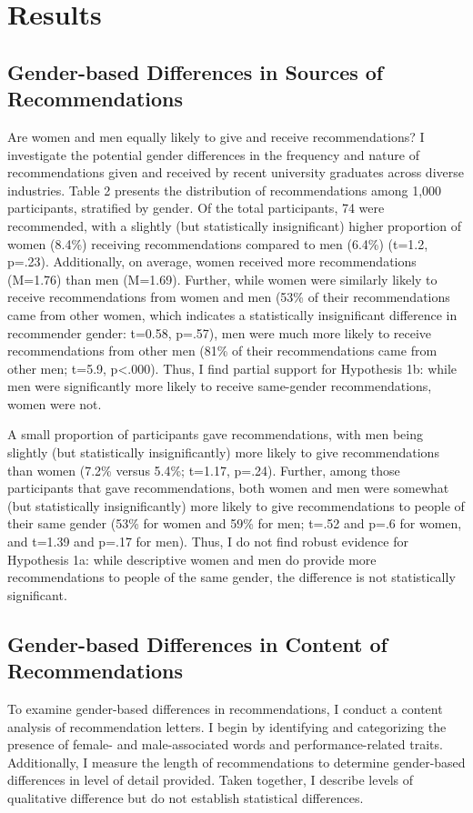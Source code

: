 \documentclass[12pt]{caltech_thesis}
\begin{document}
\chapter{Results}
\section{Gender-based Differences in Sources of Recommendations}
Are women and men equally likely to give and receive recommendations? I investigate the potential gender differences in the frequency and nature of recommendations given and received by recent university graduates across diverse industries. Table 2 presents the distribution of recommendations among 1,000 participants, stratified by gender. Of the total participants, 74 were recommended, with a slightly (but statistically insignificant) higher proportion of women (8.4\%) receiving recommendations compared to men (6.4\%) (t=1.2, p=.23). Additionally, on average, women received more recommendations (M=1.76) than men (M=1.69). Further, while women were similarly likely to receive recommendations from women and men (53\% of their recommendations came from other women, which indicates a statistically insignificant difference in recommender gender: t=0.58, p=.57), men were much more likely to receive recommendations from other men (81\% of their recommendations came from other men; t=5.9, p<.000). Thus, I find partial support for Hypothesis 1b: while men were significantly more likely to receive same-gender recommendations, women were not.  

A small proportion of participants gave recommendations, with men being slightly (but statistically insignificantly) more likely to give recommendations than women (7.2\% versus 5.4\%; t=1.17, p=.24). Further, among those participants that gave recommendations, both women and men were somewhat (but statistically insignificantly) more likely to give recommendations to people of their same gender (53\% for women and 59\% for men; t=.52 and p=.6 for women, and t=1.39 and p=.17 for men). Thus, I do not find robust evidence for Hypothesis 1a: while descriptive women and men do provide more recommendations to people of the same gender, the difference is not statistically significant.

\section{Gender-based Differences in Content of Recommendations}
To examine gender-based differences in recommendations, I conduct a content analysis of recommendation letters. I begin by identifying and categorizing the presence of female- and male-associated words and performance-related traits. Additionally, I measure the length of recommendations to determine gender-based differences in level of detail provided. Taken together, I describe levels of qualitative difference but do not establish statistical differences. 
\end{document}
